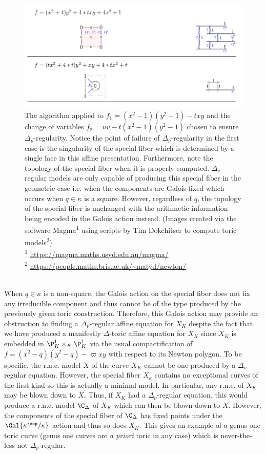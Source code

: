 \begin{figure} \label{example_with_P1s}
\includegraphics[width=\textwidth]{P1_example}
\caption[Caption for example]{The algorithm applied to $f_1 = (x^2 - 1)(y^2 - 1) - t xy$ and the change of variables $f_2 = uv - t (x^2 - 1)(y^2 - 1)$ chosen to ensure $\Delta_\nu$-regularity. Notice the point of failure of $\Delta_\nu$-regularity in the first case is the singularity of the special fiber which is determined by a single face in this affine presentation. Furthermore, note the topology of the special fiber when it is properly computed. $\Delta_\nu$-regular models are only capable of producing this special fiber in the geometric case i.e. when the components are Galois fixed which occurs when $q \in \kappa$ is a square. However, regardless of $q$, the topology of the special fiber is unchanged with the arithmetic information being encoded in the Galois action instead. (Images created via the software Magma\textsuperscript{1} using scripts by Tim Dokchitser to compute toric models\textsuperscript{2}).
\\
\small\textsuperscript{1} \url{https://magma.maths.usyd.edu.au/magma/}
\\
\small\textsuperscript{2} \url{https://people.maths.bris.ac.uk/~matyd/newton/}}
\end{figure}
\bigskip\\
When $q \in \kappa$ is a non-square, the Galois action on the special fiber does not fix any irreducible component and thus cannot be of the type produced by the previously given toric construction. Therefore, this Galois action may provide an obstruction to finding a $\Delta_\nu$-regular affine equation for $X_K$ despite the fact that we have produced a manifestly $\Delta$-toric affine equation for $X_K$ since $X_K$ is embedded in $\P^1_K \times_K \P^1_K$  via the usual compactification of $f = (x^2 - q)(y^2 - q) - \varpi xy$ with respect to its Newton polygon. To be specific, the r.n.c. model $X$ of the curve $X_K$ cannot be one produced by a $\Delta_\nu$-regular equation. However, the special fiber $X_\kappa$ contains no exceptional curves of the first kind so this is actually a minimal model. In particular, any r.n.c. of $X_K$ may be blown down to $X$. Thus, if $X_K$ had a $\Delta_\nu$-regular equation, this would produce a r.n.c. model $\C_\Delta$ of $X_K$ which can then be blown down to $X$. However, the components of the special fiber of $\C_\Delta$ has fixed points under the $\Gal{\kappa^\sep / \kappa}$-action and thus so does $X_K$. This gives an example of a genus one toric curve (genus one curves are \textit{a priori} toric in any case) which is never-the-less not $\Delta_\nu$-regular.
